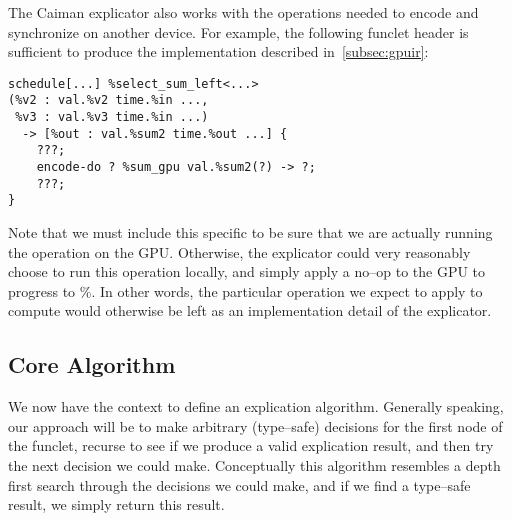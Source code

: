 The Caiman explicator also works with the operations needed to encode and synchronize on another device.  For example, the following funclet header is sufficient to produce the implementation described in~\ref{subsec:gpuir}:
%
\begin{lstlisting}
schedule[...] %select_sum_left<...>
(%v2 : val.%v2 time.%in ..., 
 %v3 : val.%v3 time.%in ...) 
  -> [%out : val.%sum2 time.%out ...] {
    ???;
    encode-do ? %sum_gpu val.%sum2(?) -> ?;
    ???;
}
\end{lstlisting}
%
Note that we must include this specific  to be sure that we are actually running the operation on the GPU.  Otherwise, the explicator could very reasonably choose to run this operation locally, and simply apply a no--op to the GPU to progress to \%.  In other words, the particular operation we expect to apply to compute  would otherwise be left as an implementation detail of the explicator.

\subsection{Core Algorithm}

We now have the context to define an explication algorithm.  Generally speaking, our approach will be to make arbitrary (type--safe) decisions for the first node of the funclet, recurse to see if we produce a valid explication result, and then try the next decision we could make.  Conceptually this algorithm resembles a depth first search through the decisions we could make, and if we find a type--safe result, we simply return this result.

